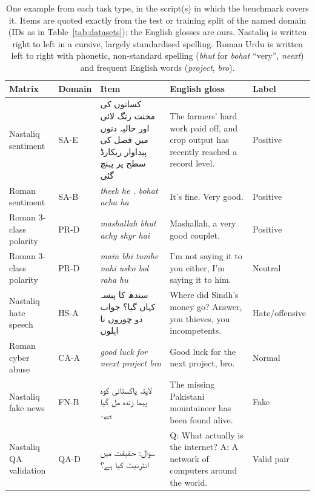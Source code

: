 \documentclass[acmsmall,screen]{acmart}
\newcommand{\ur}[1]{{\urdufont\beginR #1\endR}}
\begin{document}
\begin{table}[t]
\centering\small\renewcommand{\arraystretch}{1.35}
\caption{One example from each task type, in the script(s) in which the benchmark covers it. Items are quoted exactly from the test or training split of the named domain (IDs as in Table~\ref{tab:datasets}); the English glosses are ours. Nastaliq is written right to left in a cursive, largely standardised spelling. Roman Urdu is written left to right with phonetic, non-standard spelling (\textit{bhut} for \textit{bohat} ``very'', \textit{neext}) and frequent English words (\textit{project}, \textit{bro}).}
\label{tab:examples}
\setlength{\tabcolsep}{4pt}
\begin{tabularx}{\textwidth}{>{\raggedright\arraybackslash}p{1.7cm}>{\raggedright\arraybackslash}p{1.1cm}>{\raggedright\arraybackslash}X>{\raggedright\arraybackslash}X>{\raggedright\arraybackslash}p{1.9cm}}
\toprule
Matrix & Domain & Item & English gloss & Label \\
\midrule
Nastaliq sentiment & SA-E & \ur{کسانوں کی محنت رنگ لائی اور حالیہ دنوں میں فصل کی پیداوار ریکارڈ سطح پر پہنچ گئی} & The farmers' hard work paid off, and crop output has recently reached a record level. & Positive \\
Roman sentiment & SA-B & \textit{theek he . bohat acha ha} & It's fine. Very good. & Positive \\
Roman 3-class polarity & PR-D & \textit{mashallah bhut achy shyr hai} & Mashallah, a very good couplet. & Positive \\
Roman 3-class polarity & PR-D & \textit{main bhi tumhe nahi usko bol raha hu} & I'm not saying it to you either, I'm saying it to him. & Neutral \\
Nastaliq hate speech & HS-A & \ur{سندھ کا پیسہ کہاں گیا؟ جواب دو چوروں نا اہلوں} & Where did Sindh's money go? Answer, you thieves, you incompetents. & Hate/offensive \\
Roman cyber abuse & CA-A & \textit{good luck for neext project bro} & Good luck for the next project, bro. & Normal \\
Nastaliq fake news & FN-B & \ur{لاپتہ پاکستانی کوہ پیما زندہ مل گیا ہے۔} & The missing Pakistani mountaineer has been found alive. & Fake \\
Nastaliq QA validation & QA-D & \ur{سوال: حقیقت میں انٹرنیٹ کیا ہے؟} \newline \ur{جواب: دنیا بھر کے کمپیوٹرز کا نیٹ ورک} & Q: What actually is the internet? \newline A: A network of computers around the world. & Valid pair \\
\bottomrule
\end{tabularx}
\end{table}
\end{document}
